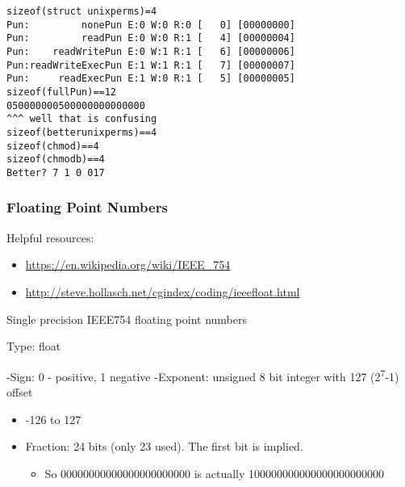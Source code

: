 \documentclass[11pt]{article}
\begin{document}
\begin{enumerate}
\begin{verbatim}
\end{verbatim}

\begin{verbatim}
sizeof(struct unixperms)=4
Pun:         nonePun E:0 W:0 R:0 [   0] [00000000]
Pun:         readPun E:0 W:0 R:1 [   4] [00000004]
Pun:    readWritePun E:0 W:1 R:1 [   6] [00000006]
Pun:readWriteExecPun E:1 W:1 R:1 [   7] [00000007]
Pun:     readExecPun E:1 W:0 R:1 [   5] [00000005]
sizeof(fullPun)==12
050000000500000000000000
^^^ well that is confusing
sizeof(betterunixperms)==4
sizeof(chmod)==4
sizeof(chmodb)==4
Better? 7 1 0 017
\end{verbatim}
\end{enumerate}

\subsubsection{Floating Point Numbers}
\label{sec:org9a4c85a}

Helpful resources:
\begin{itemize}
\item \url{https://en.wikipedia.org/wiki/IEEE\_754}
\item \url{http://steve.hollasch.net/cgindex/coding/ieeefloat.html}
\end{itemize}
Single precision IEEE754 floating point numbers

Type: float

-Sign: 0 - positive, 1 negative
-Exponent: unsigned 8 bit integer with 127 (2\textsuperscript{7}-1) offset
\begin{itemize}
\item -126 to 127
\end{itemize}
\begin{itemize}
\item Fraction: 24 bits (only 23 used). The first bit is implied. 
\begin{itemize}
\item So 00000000000000000000000 is actually 100000000000000000000000
\end{itemize}
\end{itemize}
\end{document}
